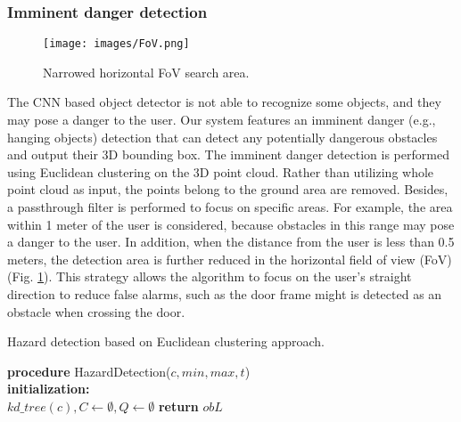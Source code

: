 \documentclass{ieeeaccess}
\begin{document}
\subsubsection{Imminent danger detection}
\begin{figure}[t]
    \centering
    \texttt{[image: images/FoV.png]}
    \caption{Narrowed horizontal FoV search area.}
    \label{fig:Fov}
\end{figure}



The CNN based object detector is not able to recognize some objects, and they may pose a danger to the user.
Our system features an imminent danger (e.g., hanging objects) detection that can detect any potentially dangerous obstacles and output their 3D bounding box. The imminent danger detection is performed using Euclidean clustering on the 3D point cloud. Rather than utilizing whole point cloud as input, the points belong to the ground area are removed. Besides, a passthrough filter is performed to focus on specific areas. For example, the area within 1 meter of the user is considered, because obstacles in this range may pose a danger to the user. In addition, when the distance from the user is less than 0.5 meters, the detection area is further reduced in the horizontal field of view (FoV) (Fig. \ref{fig:Fov}). This strategy allows the algorithm to focus on the user's straight direction to reduce false alarms, such as the door frame might is detected as an obstacle when crossing the door. 
\begin{algorithm}
\caption{Hazard detection based on Euclidean clustering approach.}
\label{alg:EcludeanClustering}
{}     
\textbf{procedure} HazardDetection($c, min, max, t$) \\
\Indp
\textbf{initialization:}  \\
\quad $kd\_tree(c), C \leftarrow \emptyset, Q\leftarrow \emptyset$\;
\textbf{return} $obL$\;
\end{algorithm}
\end{document}
